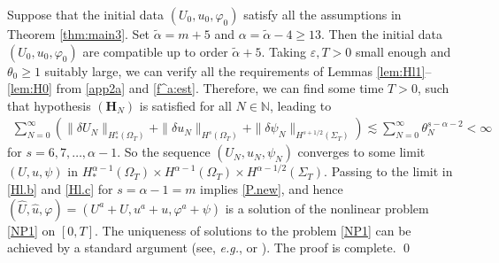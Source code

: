 \documentclass[twoside,11pt]{article}
\numberwithin{equation}{section}
\begin{document}
\vspace{2mm}
\quad
Suppose that the initial data $(U_0,u_0, \varphi_0)$ satisfy all the assumptions in Theorem {\rm\ref{thm:main3}}.
Set $\widetilde{\alpha}=m+{5}$ and ${\alpha }=\widetilde{\alpha}-4\geq 13$.
Then the initial data $(U_0,u_0,\varphi_0)$ are compatible up to order $%
\widetilde{\alpha}+{5}$.
Taking $\varepsilon, T>0$ small enough and $\theta_0\geq 1$ suitably large, we can
verify all the requirements of Lemmas \ref{lem:Hl1}--\ref{lem:H0} from  \eqref{app2a} and \eqref{f^a:est}.
Therefore, we can find some time $T>0$, such that hypothesis $(\mathbf{H}_{{N}})$ is satisfied for all ${N}\in\mathbb{N}$, leading to
\begin{align*}
	\sum_{N=0}^{\infty}\left(
	\|\delta U_N\|_{H_*^s(\Omega_{T})}+\|\delta u_N\|_{H^{s}(\Omega_{T})}
	+\| \delta\psi_N \|_{H^{s+1/2}(\Sigma_T)}
	\right)
	\lesssim \sum_{N=0}^{\infty}\theta_N^{s-{\alpha }-2} <\infty
\end{align*}
for $s=6,7,\ldots, {\alpha }-1.$
So the sequence $(U_{N},u_N,\psi_N)$ converges to some limit $(U, u, \psi)$ in $H_*^{{\alpha }-1}(\Omega_{T})\times H^{{\alpha }-1}(\Omega_{T}) \times H^{{\alpha }-1/2}({\Sigma_T})$.
Passing to the limit in \eqref{Hl.b} and \eqref{Hl.c} for $s=\alpha-1=m $ implies \eqref{P.new}, and
hence $(\widehat{U}, \hat{u}, \varphi)=(U^a+U, u^a+u, \varphi^a+\psi)$
is a solution of the nonlinear problem \eqref{NP1} on $[0,T]$.
The uniqueness of solutions to the problem \eqref{NP1} can be achieved by a standard argument (see, {\it e.g.}, \cite[\S 13]{ST14MR3151094} or \cite[\S 3.5]{TW22aMR4444136}).
The proof is complete.
\qed
	
	


	
	\appendix

\vspace*{2mm}
\end{document}
